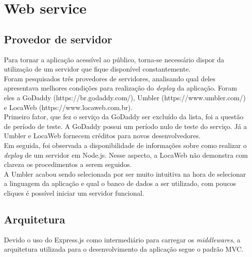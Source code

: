 \documentclass[
	12pt,				%
	oneside,			%
	a4paper,			%
	brazil				%
]{abntex2}
\begin{document}
{\section{Web service}

\subsection{Provedor de servidor}

Para tornar a aplicação acessível ao público, torna-se necessário dispor da utilização de um servidor que fique disponível constantemente. \\

Foram pesquisados três provedores de servidores, analisando qual deles apresentava melhores condições para realização do \textit{deploy} da aplicação. Foram eles a GoDaddy (https://br.godaddy.com/), Umbler (https://www.umbler.com/) e LocaWeb (https://www.locaweb.com.br).\\

Primeiro fator, que fez o serviço da GoDaddy ser excluído da lista, foi a questão de período de teste. A GoDaddy possui um período nulo de teste do serviço. Já a Umbler e LocaWeb fornecem créditos para novos desenvolvedores.\\

Em seguida, foi observada a disponibilidade de informações sobre como realizar o \textit{deploy} de um servidor em Node.js. Nesse aspecto, a LocaWeb não demonstra com clareza os procedimentos a serem seguidos.\\

A Umbler acabou sendo selecionada por ser muito intuitiva na hora de selecionar a linguagem da aplicação e qual o banco de dados a ser utilizado, com poucos cliques é possível iniciar um servidor funcional.


\subsection{Arquitetura}

Devido o uso do Express.js como intermediário para carregar os \textit{middlewares}, a arquitetura utilizada para o desenvolvimento da aplicação segue o padrão MVC.

}
\end{document}
